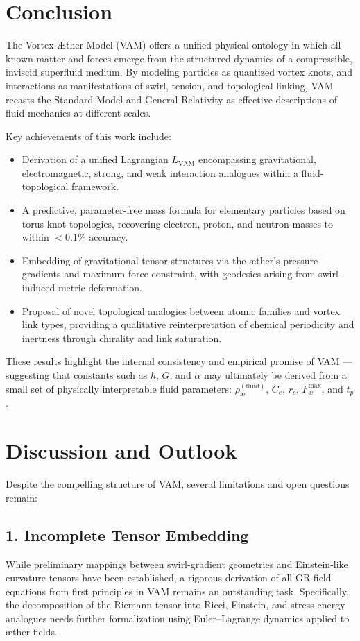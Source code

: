 \documentclass[a4paper,12pt]{article}
\begin{document}
\section{Conclusion}

The Vortex Æther Model (VAM) offers a unified physical ontology in which all known matter and forces emerge from the structured dynamics of a compressible, inviscid superfluid medium. By modeling particles as quantized vortex knots, and interactions as manifestations of swirl, tension, and topological linking, VAM recasts the Standard Model and General Relativity as effective descriptions of fluid mechanics at different scales.

Key achievements of this work include:
\begin{itemize}
    \item Derivation of a unified Lagrangian $L_{\text{VAM}}$ encompassing gravitational, electromagnetic, strong, and weak interaction analogues within a fluid-topological framework.
    \item A predictive, parameter-free mass formula for elementary particles based on torus knot topologies, recovering electron, proton, and neutron masses to within $<0.1\%$ accuracy.
    \item Embedding of gravitational tensor structures via the æther's pressure gradients and maximum force constraint, with geodesics arising from swirl-induced metric deformation.
    \item Proposal of novel topological analogies between atomic families and vortex link types, providing a qualitative reinterpretation of chemical periodicity and inertness through chirality and link saturation.
\end{itemize}

These results highlight the internal consistency and empirical promise of VAM — suggesting that constants such as $\hbar$, $G$, and $\alpha$ may ultimately be derived from a small set of physically interpretable fluid parameters: $\rho_{\text{\ae}}^{(\text{fluid})}$, $C_e$, $r_c$, $F^{\max}_{\text{\ae}}$, and $t_p$.

\vspace{1em}
\section{Discussion and Outlook}

Despite the compelling structure of VAM, several limitations and open questions remain:

\subsection*{1. Incomplete Tensor Embedding}
While preliminary mappings between swirl-gradient geometries and Einstein-like curvature tensors have been established, a rigorous derivation of all GR field equations from first principles in VAM remains an outstanding task. Specifically, the decomposition of the Riemann tensor into Ricci, Einstein, and stress-energy analogues needs further formalization using Euler–Lagrange dynamics applied to æther fields.
\end{document}
